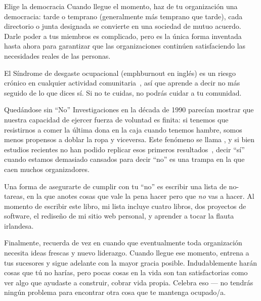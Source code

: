 \begin{aside}{Elige la democracia}
  Cuando llegue el momento,
  haz de tu organización una democracia:
  tarde o temprano (generalmente más temprano que tarde),
  cada directorio o junta designada se convierte en una sociedad de mutuo acuerdo.
  Darle poder a tus miembros es complicado,
  pero es la única forma inventada hasta ahora para garantizar
  que las organizaciones continúen satisfaciendo las necesidades reales de las personas.
\end{aside}


El Síndrome de desgaste ocupacional (emph{burnout} en inglés) es un riesgo crónico en cualquier actividad comunitaria~\cite{Pign2016},
así que aprende a decir no más seguido de lo que dices sí.
Si no te cuidas,
no podrás cuidar a tu comunidad.

\begin{aside}{Quedándose sin ``No''}
  Investigaciones en la década de 1990 parecían mostrar que nuestra capacidad de ejercer fuerza de voluntad es finita:
  si tenemos que resistirnos a comer la última dona en la caja cuando tenemos hambre,
  somos menos propensos a doblar la ropa y viceversa.
  Este fenómeno se llama ,
  y si bien estudios recientes no han podido replicar esos primeros resultados~\cite{Hagg2016},
  decir ``sí'' cuando estamos demasiado cansados para decir ``no''
  es una trampa en la que caen muchos organizadores.
\end{aside}

Una forma de asegurarte de cumplir con tu ``no''
es escribir una lista de no-tareas, en la que anotes cosas que vale la pena hacer
pero que \emph{no} vas a hacer.
Al momento de escribir este libro, mi lista incluye cuatro libros,
dos proyectos de software,
el rediseño de mi sitio web personal,
y aprender a tocar la flauta irlandesa. 

Finalmente,
recuerda de vez en cuando que
eventualmente toda organización necesita ideas frescas y nuevo liderazgo.
Cuando llegue ese momento,
entrena a tus sucesores y sigue adelante con la mayor gracia posible.
Indudablemente harán cosas que tú no harías,
pero pocas cosas en la vida son tan satisfactorias como 
ver algo que ayudaste a construir, cobrar vida propia.
Celebra eso --- no tendrás ningún problema para encontrar otra cosa que te mantenga ocupado/a.


